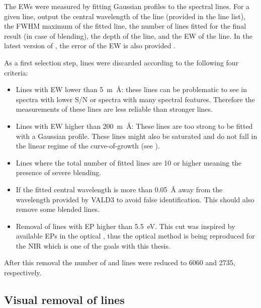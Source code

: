 The EWs were measured by fitting Gaussian profiles to the spectral lines. For a given line,
 output the central wavelength of the line (provided in the line list), the FWHM maximum
of the fitted line, the number of lines fitted for the final result (in case of blending), the depth
of the line, and the EW of the line. In the latest version of , the error of the EW is
also provided \citep{Sousa2015a}.

As a first selection step, lines were discarded according to the following four criteria:

\begin{itemize}
  \item Lines with EW lower than \SI{5}{m\angstrom}: these lines can be problematic to see in
        spectra with lower S/N or spectra with many spectral features. Therefore the measurements
        of these lines are less reliable than stronger lines.
  \item Lines with EW higher than \SI{200}{m\angstrom}: These lines are too strong to be fitted
        with a Gaussian profile. These lines might also be saturated and do not fall in the linear
        regime of the curve-of-growth (see ).
  \item Lines where the total number of fitted lines are 10 or higher meaning the presence of
        severe blending.
  \item If the fitted central wavelength is more than \SI{0.05}{\angstrom} away from the wavelength
        provided by VALD3 to avoid false identification. This should also remove some blended lines.
  \item Removal of lines with EP higher than \SI{5.5}{eV}. This cut was inspired by available EPs in
        the optical \citep[see e.g.][]{Sousa2008a}, thus the optical method is being reproduced for
        the NIR which is one of the goals with this thesis.
\end{itemize}
After this removal the number of  and  lines were reduced to \num{6060} and
\num{2735}, respectively.


\subsection{Visual removal of lines}
\label{sec:visual}

